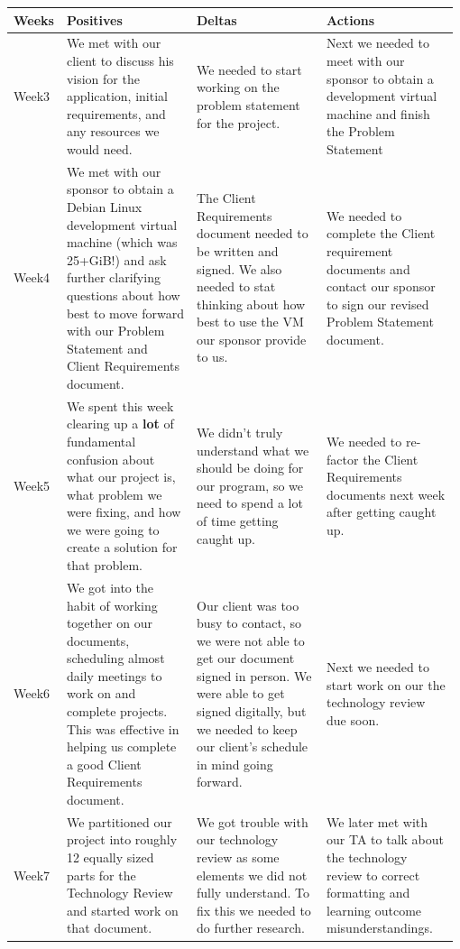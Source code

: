 \begin{longtable}{ | p{0.075\linewidth} | p{0.3\linewidth} | p{0.3\linewidth} | p{0.3\linewidth} |} \hline
  Weeks & Positives & Deltas & Actions \\ \hline
  	Week3 &
    We met with our client to discuss his vision for the application, initial requirements, and any resources we would need. &
    We needed to start working on the problem statement for the project. &
    Next we needed to meet with our sponsor to obtain a development virtual machine and finish the Problem Statement \\ \hline
  	Week4 &
    We met with our sponsor to obtain a Debian Linux development virtual machine (which was 25+GiB!) and ask further clarifying questions about how best to move forward with our Problem Statement and Client Requirements document. &
    The Client Requirements document needed to be written and signed. We also needed to stat thinking about how best to use the VM our sponsor provide to us. &
    We needed to complete the Client requirement documents and contact our sponsor to sign our revised Problem Statement document.\\ \hline
  	Week5 &
    We spent this week clearing up a \textbf{lot} of fundamental confusion about what our project is, what problem we were fixing, and how we were going to create a solution for that problem. &
    We didn't truly understand what we should be doing for our program, so we need to spend a lot of time getting caught up. &
    We needed to re-factor the Client Requirements documents next week after getting caught up.  \\ \hline
  	Week6 &
  	We got into the habit of working together on our documents, scheduling almost daily meetings to work on and complete projects. This was effective in helping us complete a good Client Requirements document.&
    Our client was too busy to contact, so we were not able to get our document signed in person. We were able to get signed digitally, but we needed to keep our client's schedule in mind going forward.&
  	Next we needed to start work on our the technology review due soon. \\ \hline
  	Week7 &
  	We partitioned our project into roughly 12 equally sized parts for the Technology Review and started work on that document. &
  	We got trouble with our technology review as some elements we did not fully understand. To fix this we needed to do further research. &
  	We later met with our TA to talk about the technology review to correct formatting and learning outcome misunderstandings. \\ \hline

\end{longtable}
